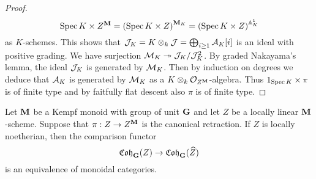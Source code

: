 \begin{proof}
$$\mathrm{Spec}\, K\times Z^{\mathbf{M}} = \left(\mathrm{Spec}\, K \times Z\right)^{\mathbf{M}_K} = \left(\mathrm{Spec}\, K \times Z\right)^{\mathbb{A}^1_K}$$
as $K$-schemes. This shows that ${\mathcal J}_K = K\otimes_k{\mathcal J} = \bigoplus_{i\geq 1} {\mathcal A}_K[i]$ is an ideal with positive grading. We have surjection ${\mathcal M}_K\twoheadrightarrow {\mathcal J}_K/{\mathcal J}_K^2$. By graded Nakayama's lemma, the ideal ${\mathcal J}_K$  is generated by ${\mathcal M}_K$. Then by induction on degrees we deduce that ${\mathcal A}_K$ is generated by ${\mathcal M}_K$ as a $K\otimes_k{\mathcal O}_{Z^{\mathbf{M}}}$-algebra. Thus $1_{\mathrm{Spec}\, K}\times\pi$ is of finite type and by faitfully flat descent also $\pi$ is of finite type.
\end{proof}

\begin{theorem}
Let $\mathbf{M}$ be a Kempf monoid with group of unit $\mathbf{G}$ and let $Z$ be a locally linear $\mathbf{M}$-scheme. Suppose that $\pi:Z\rightarrow Z^{\mathbf{M}}$ is the canonical retraction. If $Z$ is locally noetherian, then the comparison functor
$$\mathfrak{Coh}_{\mathbf{G}}(Z)\rightarrow \mathfrak{Coh}_{\mathbf{G}}(\widehat{Z})$$
is an equivalence of monoidal categories.
\end{theorem}
